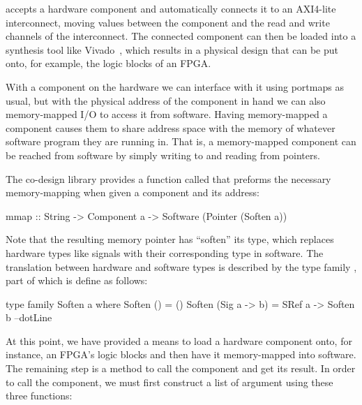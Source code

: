 \documentclass[../main.tex]{subfiles}
\begin{document}
 accepts a hardware component and automatically connects it to an AXI4-lite interconnect, moving values between the component and the read and write channels of the interconnect. The connected component can then be loaded into a synthesis tool like Vivado~\cite{feist2012}, which results in a physical design that can be put onto, for example, the logic blocks of an FPGA.


With a component on the hardware we can interface with it using portmaps as usual, but with the physical address of the component in hand we can also memory-mapped I/O to access it from software. Having memory-mapped a component causes them to share address space with the memory of whatever software program they are running in. That is, a memory-mapped component can be reached from software by simply writing to and reading from pointers.


The co-design library provides a function called  that preforms the necessary memory-mapping when given a component and its address:

\begin{code}
mmap :: String -> Component a -> Software (Pointer (Soften a))
\end{code}

\noindent Note that the resulting memory pointer has ``soften'' its type, which replaces hardware types like signals with their corresponding type in software. The translation between hardware and software types is described by the type family , part of which is define as follows:

\begin{code}
type family Soften a where
  Soften ()           = ()
  Soften (Sig a -> b) = SRef a -> Soften b
  --dotLine
\end{code}

At this point, we have provided a means to load a hardware component onto, for instance, an FPGA's logic blocks and then have it memory-mapped into software. The remaining step is a method to call the component and get its result. In order to call the component, we must first construct a list of argument using these three functions:
\end{document}
